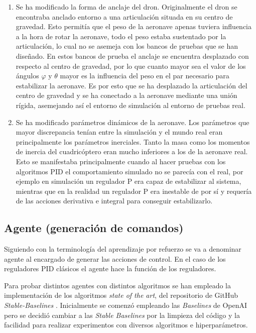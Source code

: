 \begin{enumerate}
	\item Se ha modificado la forma de anclaje del dron. Originalmente el dron se encontraba anclado entorno a una articulación situada en su centro de gravedad. Esto permitía que el peso de la aeronave apenas tuviera influencia a la hora de rotar la aeronave, todo el peso estaba sustentado por la articulación, lo cual no se asemeja con los bancos de pruebas que se han diseñado. En estos bancos de prueba el anclaje se encuentra desplazado con respecto al centro de gravedad, por lo que cuanto mayor sea el valor de los ángulos $\varphi$ y $\theta$ mayor es la influencia del peso en el par necesario para estabilizar la aeronave. Es por esto que se ha desplazado la articulación del centro de gravedad y se ha conectado a la aeronave mediante una unión rígida, asemejando así el entorno de simulación al entorno de pruebas real.
	\item Se ha modificado parámetros dinámicos de la aeronave. Los parámetros que mayor discrepancia tenían entre la simulación y el mundo real eran principalmente los parámetros inerciales. Tanto la masa como los momentos de inercia del cuadricóptero eran mucho inferiores a los de la aeronave real. Esto se manifestaba principalmente cuando al hacer pruebas con los algoritmos PID el comportamiento simulado no se parecía con el real, por ejemplo en simulación un regulador P era capaz de estabilizar al sistema, mientras que en la realidad un regulador P era inestable de por sí y requería de las acciones derivativa e integral para conseguir estabilizarlo.
\end{enumerate}



 \subsection{Agente (generación de comandos)}
 
 Siguiendo con la terminología del aprendizaje por refuerzo se va a denominar agente al encargado de generar las acciones de control. En el caso de los reguladores PID clásicos el agente hace la función de los reguladores.

Para probar distintos agentes con distintos algoritmos se han empleado la implementación de los algoritmos \textit{state of the art}, del repositorio de GitHub \textit{Stable-Baselines} \cite{stable-baselines}. Inicialmente se comenzó empleando las \textit{Baselines} de OpenAI \cite{OpenAIbaselines} pero se decidió cambiar a las \textit{Stable Baselines} por la limpieza del código y la facilidad para realizar experimentos con diversos algoritmos e hiperparámetros.

